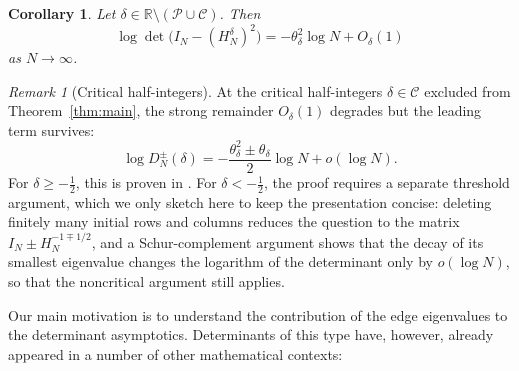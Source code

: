 \documentclass[11pt,a4paper,reqno]{amsart}
\newtheorem{corollary}[theorem]{Corollary}
\theoremstyle{remark}
\newtheorem{remark}[theorem]{Remark}
\newcommand{\id}{I}
\begin{document}
\begin{corollary}\label{cor:main-sq}
Let $\delta\in\mathbb R\setminus(\mathcal P\cup\mathcal C)$. Then
\begin{equation}\label{eq:strong-main-sq}
 \log\det\bigl(\id_N-(H_N^\delta)^2\bigr)
 =-\theta_\delta^2\log N+O_\delta(1)
\end{equation}
as $N\to\infty$.
\end{corollary}

\begin{remark}[Critical half-integers]
At the critical half-integers $\delta\in\mathcal C$ excluded from
Theorem~\ref{thm:main}, the strong remainder $O_\delta(1)$ degrades but the
leading term survives:
\begin{equation}\label{eq:critical-weak}
 \log D_N^\pm(\delta)
 =-\frac{\theta_\delta^2\pm\theta_\delta}{2}\log N+o(\log N).
\end{equation}
For $\delta\ge-\frac12$, this is proven in \cite{Otte}.
For $\delta<-\frac12$, the proof requires a separate threshold
argument, which we only sketch here to keep the presentation
concise: deleting finitely many initial rows and columns
reduces the question to the matrix $\id_N\pm H_N^{-1\mp1/2}$, and a
Schur-complement argument shows that the decay of its smallest eigenvalue
changes the logarithm of the determinant only by \(o(\log N)\), so that the
noncritical argument still applies.
\end{remark}

Our main motivation is to understand the contribution of the edge eigenvalues to
the determinant asymptotics. Determinants of this type have, however, already
appeared in a number of other mathematical contexts:
\end{document}
